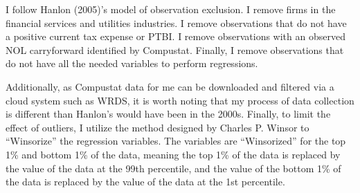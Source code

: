 \documentclass{article}
\begin{document}
I follow Hanlon (2005)’s model of observation exclusion. I remove firms in the financial services and utilities industries. I remove observations that do not have a positive current tax expense or PTBI. I remove observations with an observed NOL carryforward identified by Compustat. Finally, I remove observations that do not have all the needed variables to perform regressions.

Additionally, as Compustat data for me can be downloaded and filtered via a cloud system such as WRDS, it is worth noting that my process of data collection is different than Hanlon’s would have been in the 2000s. Finally, to limit the effect of outliers, I utilize the method designed by Charles P. Winsor to “Winsorize” the regression variables. The variables are “Winsorized” for the top 1\% and bottom 1\% of the data, meaning the top 1\% of the data is replaced by the value of the data at the 99th percentile, and the value of the bottom 1\% of the data is replaced by the value of the data at the 1st percentile.
\end{document}

